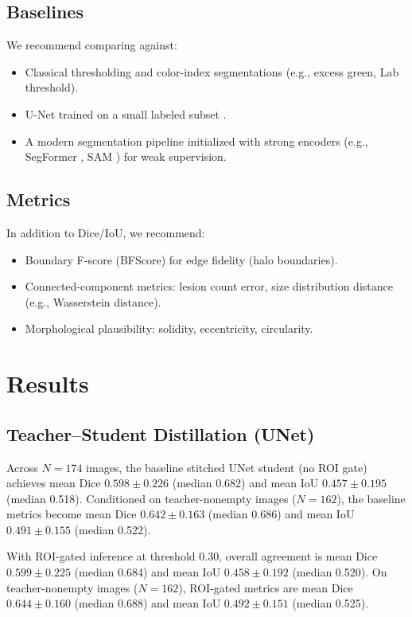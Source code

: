 \documentclass[journal]{IEEEtran}
\begin{document}
\subsection{Baselines}
We recommend comparing against:
\begin{itemize}
    \item Classical thresholding and color-index segmentations (e.g., excess green, Lab threshold).
    \item U-Net trained on a small labeled subset \cite{ronneberger2015u}.
    \item A modern segmentation pipeline initialized with strong encoders (e.g., SegFormer \cite{xie2021segformer}, SAM \cite{kirillov2023segment}) for weak supervision.
\end{itemize}

\subsection{Metrics}
In addition to Dice/IoU, we recommend:
\begin{itemize}
    \item Boundary F-score (BFScore) for edge fidelity (halo boundaries).
    \item Connected-component metrics: lesion count error, size distribution distance (e.g., Wasserstein distance).
    \item Morphological plausibility: solidity, eccentricity, circularity.
\end{itemize}

\section{Results}
\subsection{Teacher--Student Distillation (UNet)}
Across $N=174$ images, the baseline stitched UNet student (no ROI gate) achieves mean Dice $0.598\pm0.226$ (median 0.682) and mean IoU $0.457\pm0.195$ (median 0.518). Conditioned on teacher-nonempty images ($N=162$), the baseline metrics become mean Dice $0.642\pm0.163$ (median 0.686) and mean IoU $0.491\pm0.155$ (median 0.522).

With ROI-gated inference at threshold 0.30, overall agreement is mean Dice $0.599\pm0.225$ (median 0.684) and mean IoU $0.458\pm0.192$ (median 0.520). On teacher-nonempty images ($N=162$), ROI-gated metrics are mean Dice $0.644\pm0.160$ (median 0.688) and mean IoU $0.492\pm0.151$ (median 0.525).
\end{document}
